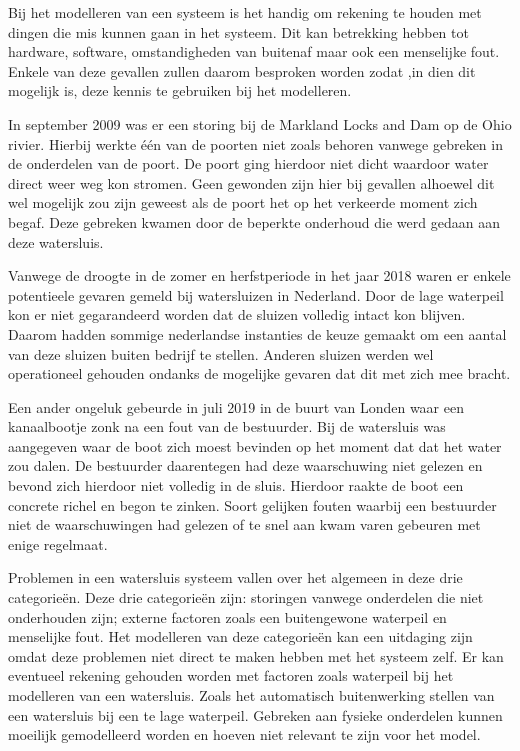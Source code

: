 \documentclass[../literatuuronderzoek.tex]{subfiles}
\begin{document}
Bij het modelleren van een systeem is het handig om rekening te houden met dingen die mis kunnen gaan in het systeem.
Dit kan betrekking hebben tot hardware, software, omstandigheden van buitenaf maar ook een menselijke fout.
Enkele van deze gevallen zullen daarom besproken worden zodat ,in dien dit mogelijk is, deze kennis te gebruiken bij het modelleren.

In september 2009 was er een storing bij de Markland Locks and Dam op de Ohio rivier. 
Hierbij werkte één van de poorten niet zoals behoren vanwege gebreken in de onderdelen van de poort\cite{herald-dispatch_2009}.  
De poort ging hierdoor niet dicht waardoor water direct weer weg kon stromen.
Geen gewonden zijn hier bij gevallen alhoewel dit wel mogelijk zou zijn geweest als de poort het op het verkeerde moment zich begaf.
Deze gebreken kwamen door de beperkte onderhoud die werd gedaan aan deze watersluis.

Vanwege de droogte in de zomer en herfstperiode in het jaar 2018 waren er enkele potentieele gevaren gemeld bij watersluizen in Nederland\cite{poelgeest_2020}.
Door de lage waterpeil kon er niet gegarandeerd worden dat de sluizen volledig intact kon blijven.
Daarom hadden sommige nederlandse instanties de keuze gemaakt om een aantal van deze sluizen buiten bedrijf te stellen.
Anderen sluizen werden wel operationeel gehouden ondanks de mogelijke gevaren dat dit met zich mee bracht.

Een ander ongeluk gebeurde in juli 2019 in de buurt van Londen waar een kanaalbootje zonk na een fout van de bestuurder\cite{james_rodger_2019}.
Bij de watersluis was aangegeven waar de boot zich moest bevinden op het moment dat dat het water zou dalen.
De bestuurder daarentegen had deze waarschuwing niet gelezen en bevond zich hierdoor niet volledig in de sluis.
Hierdoor raakte de boot een concrete richel en begon te zinken.
Soort gelijken fouten waarbij een bestuurder niet de waarschuwingen had gelezen of te snel aan kwam varen gebeuren met enige regelmaat.

Problemen in een watersluis systeem vallen over het algemeen in deze drie categorieën. 
Deze drie categorieën zijn: storingen vanwege onderdelen die niet onderhouden zijn; externe factoren zoals een buitengewone waterpeil en menselijke fout.
Het modelleren van deze categorieën kan een uitdaging zijn omdat deze problemen niet direct te maken hebben met het systeem zelf.
Er kan eventueel rekening gehouden worden met factoren zoals waterpeil bij het modelleren van een watersluis. 
Zoals het automatisch buitenwerking stellen van een watersluis bij een te lage waterpeil. 
Gebreken aan fysieke onderdelen kunnen moeilijk gemodelleerd worden en hoeven niet relevant te zijn voor het model.
\end{document}

